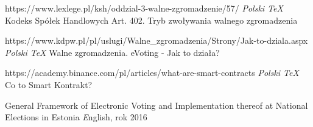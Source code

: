 \documentclass[a4paper,12pt]{book}
\begin{document}
\begin{thebibliography}{99}
https://www.lexlege.pl/ksh/oddzial-3-walne-zgromadzenie/57/
\emph{Polski \TeX} Kodeks Spółek Handlowych Art. 402. Tryb zwoływania walnego zgromadzenia

 https://www.kdpw.pl/pl/uslugi/Walne\_zgromadzenia/Strony/Jak-to-dziala.aspx
\emph{Polski \TeX} Walne zgromadzenia. eVoting - Jak to działa?

 https://academy.binance.com/pl/articles/what-are-smart-contracts
\emph{Polski \TeX} Co to Smart Kontrakt?

 General Framework of Electronic Voting
and Implementation thereof at National Elections in
Estonia \emph English, rok 2016

\end{thebibliography}
\end{document}
